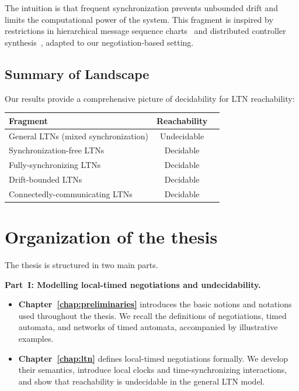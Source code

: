 The intuition is that frequent synchronization prevents unbounded drift and limits the computational power of the system. This fragment is inspired by restrictions in hierarchical message sequence charts~\cite{HenriksenMSG} and distributed controller synthesis~\cite{PnueliRosner}, adapted to our negotiation-based setting.

\subsection{Summary of Landscape}

Our results provide a comprehensive picture of decidability for LTN reachability:

\begin{center}
\begin{tabular}{lcc}
\toprule
\textbf{Fragment} & \textbf{Reachability} \\
\midrule
General LTNs (mixed synchronization) & Undecidable \\
Synchronization-free LTNs & Decidable \\
Fully-synchronizing LTNs & Decidable \\
Drift-bounded LTNs & Decidable \\
Connectedly-communicating LTNs & Decidable \\
\bottomrule
\end{tabular}
\end{center}


\section{Organization of the thesis}
\label{sec:organization}

The thesis is structured in two main parts.

\medskip
\noindent\textbf{Part~I: Modelling local-timed negotiations and undecidability.}

\begin{itemize}
  \item \textbf{Chapter~\ref{chap:preliminaries}} introduces the basic notions and notations used throughout the thesis. We recall the definitions of negotiations, timed automata, and networks of timed automata, accompanied by illustrative examples.
  \item \textbf{Chapter~\ref{chap:ltn}} defines local-timed negotiations formally. We develop their semantics, introduce local clocks and time-synchronizing interactions, and show that reachability is undecidable in the general LTN model.
\end{itemize}

